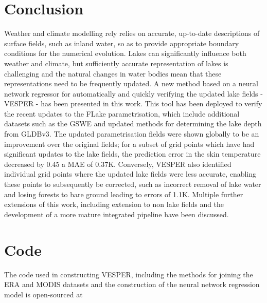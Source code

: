\documentclass[hess, twostagejnl]{copernicus}
\providecommand{\DIFadd}[1]{{\protect\color{blue} \sf #1}} %
\providecommand{\DIFdel}[1]{{\protect\color{red} \scriptsize #1}} %
\providecommand{\DIFaddbegin}{} %
\providecommand{\DIFaddend}{} %
\providecommand{\DIFdelbegin}{} %
\providecommand{\DIFdelend}{} %
\begin{document}
\section{Conclusion}\label{sec:conclusion}
Weather and climate modelling \DIFdelbegin \DIFdel{rely }\DIFdelend \DIFaddbegin \DIFadd{relies }\DIFaddend on accurate, up-to-date descriptions of surface fields, such as inland water, so as to provide appropriate boundary conditions for the numerical evolution. Lakes can significantly influence both weather and climate, but sufficiently  accurate  representation  of  lakes  is  challenging  and  the  natural  changes  in  water  bodies  mean  that  these representations  need  to  be  frequently  updated.  A  new  method  based  on  a  neural  network  regressor  for  automatically  and quickly verifying the updated lake fields - VESPER - has been presented in this work. This tool has been deployed to verify the recent updates to the FLake parametrisation, which include additional datasets such as the GSWE and updated methods for determining the lake depth from GLDBv3. The updated parametrisation fields were shown globally to be an improvement over the original fields; for a subset of grid points which have had significant updates to the lake fields, the prediction error in the skin temperature decreased by \DIFdelbegin \DIFdel{0.45}\DIFdelend \DIFaddbegin \DIFadd{a MAE of 0.37}\DIFaddend K. Conversely, VESPER also identified individual grid points where the updated lake fields were less accurate, enabling these points to subsequently be corrected, such as \DIFaddbegin \DIFadd{incorrect removal of lake water and }\DIFaddend losing forests to bare ground\DIFdelbegin \DIFdel{leading to errors of 1.1K}\DIFdelend . Multiple further extensions of this work, including extension to non lake fields and the development of a more mature integrated pipeline have been discussed.





\DIFdelbegin \section{\DIFdel{Code}}
\addtocounter{section}{-1}%
\DIFdel{The code used in constructing VESPER, including the methods for joining the ERA and MODIS datasets and the construction of the neural network regression model is open-sourced at }%
\DIFdelend \DIFaddbegin \clearpage
\newpage
\DIFadd{\mbox{~}

}\DIFaddend 
\end{document}
